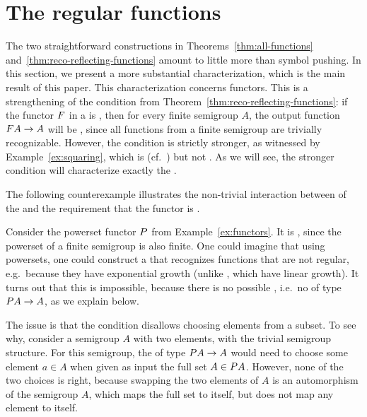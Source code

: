 \section{The regular functions}
\label{sec:reg-char}
The two straightforward constructions in Theorems~\ref{thm:all-functions} and~\ref{thm:reco-reflecting-functions}  amount to little more than symbol pushing. In this section, we present a more substantial characterization, which is the main result of this paper.
This characterization concerns  functors.
This is a strengthening of the condition from Theorem~\ref{thm:reco-reflecting-functions}: if the functor $\functor$ in a  is , then for every finite semigroup $A$, the output function $\functor A \to A$ will be , since all functions from a finite semigroup are trivially recognizable.  However, the condition is strictly stronger, as witnessed by Example~\ref{ex:squaring}, which is  (cf.~) but not . As we will see, the stronger condition will characterize exactly the .

The following counterexample illustrates the non-trivial interaction between  of the  and the requirement that the functor is .

\begin{example}
    Consider the powerset functor $\powerset$ from Example~\ref{ex:functors}. It is , since the powerset of a finite semigroup is also finite. One could imagine that using powersets, one could construct a  that recognizes functions that are not regular, e.g.~because they have exponential growth (unlike , which have linear growth). It turns out that this is impossible, because there is no possible , i.e.~no  of type $\powerset A \to A$, as we explain below.

    The issue is that the  condition disallows choosing elements from a subset.  To see why, consider a semigroup $A$ with two elements, with the trivial  semigroup structure. For this semigroup, the  of type $\powerset A \to A$ would need to choose some element $a \in A$ when given as input the full set $A \in \powerset A$. However, none of the two choices is right, because swapping the two elements of $A$ is an automorphism of the semigroup $A$, which maps the full set to itself, but does not map any element to itself.
\end{example}

